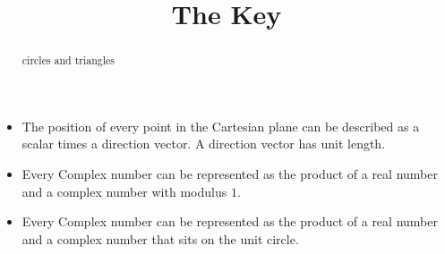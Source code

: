 \documentclass{ximera}
\title{The Key}
\begin{document}
\begin{abstract}
circles and triangles
\end{abstract}
\maketitle



\begin{itemize}
\item The position of every point in the Cartesian plane can be described as a scalar times a direction vector.  A direction vector has unit length.

\item Every Complex number can be represented as the product of a real number and a complex number with modulus $1$.


\item Every Complex number can be represented as the product of a real number and a complex number that sits on the unit circle.
\end{itemize}
\end{document}
